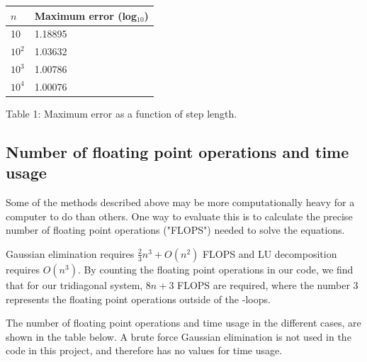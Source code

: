 \documentclass{article}
\begin{document}
\begin{multicols}{2}
\begin{center}
\begin{tabular}{ l l }\hline
	$n$ 		&Maximum error (log$_{10}$) \\ \hline
	10 		& 1.18895 \\
	$10^2$  	& 1.03632 \\
	$10^3$ 	& 1.00786 \\
	$10^4$ 	& 1.00076 \\
	\hline
\end{tabular}
\end{center}

\begin{center}
Table 1: Maximum error as a function of step length.
\end{center}

\subsection{Number of floating point operations and time usage}
Some of the methods described above may be more computationally heavy for a computer to do than others. One way to evaluate this is to calculate the precise number of floating point operations ("FLOPS") needed to solve the equations.

Gaussian elimination requires $\frac{2}{3}n^3 + O(n^2)$ FLOPS and LU decomposition requires $O(n^3)$. By counting the floating point operations in our code, we find that for our tridiagonal system, $8n + 3$ FLOPS are required, where the number 3 represents the floating point operations outside of the \verb@for@-loops. 

The number of floating point operations and time usage in the different cases, are shown in the table below. A brute force Gaussian elimination is not used in the code in this project, and therefore has no values for time usage.



\end{multicols}
\end{document}
